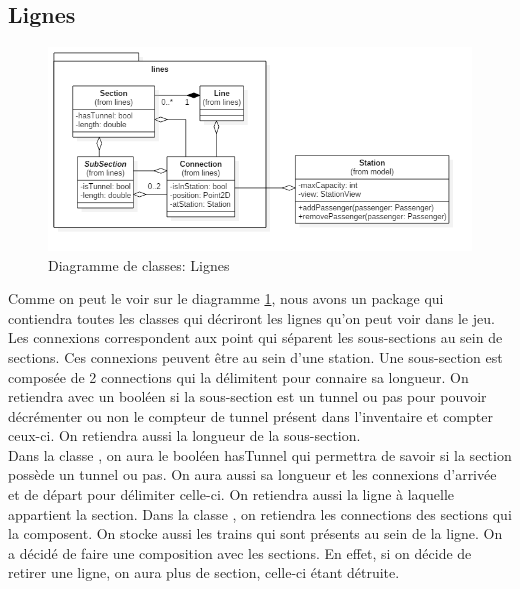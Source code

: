 \documentclass[report, backcover, french, nodocumentinfo]{upmethodology-document}
\begin{document}
			\subsection{Lignes}
				\begin{figure}[h!]
					\centering
					\includegraphics[width=1\textwidth]{figures/LinesClassDiagram}
					\caption{Diagramme de classes: Lignes}
					\label{fig:LinesClassDiagram}
				\end{figure}
					Comme on peut le voir sur le diagramme \ref{fig:LinesClassDiagram}, nous avons un package  qui contiendra toutes les classes qui décriront les lignes qu'on peut voir dans le jeu. Les connexions correspondent aux point qui séparent les sous-sections au sein de sections. Ces connexions peuvent être au sein d'une station.
					Une sous-section est composée de 2 connections qui la délimitent pour connaire sa longueur. On retiendra avec un booléen si la sous-section est un tunnel ou pas pour pouvoir décrémenter ou non le compteur de tunnel présent dans l'inventaire et compter ceux-ci. On retiendra aussi la longueur de la sous-section.\\
					Dans la classe , on aura le booléen hasTunnel qui permettra de savoir si la section possède un tunnel ou pas. On aura aussi sa longueur et les connexions d'arrivée et de départ pour délimiter celle-ci. On retiendra aussi la ligne à laquelle appartient la section.
					Dans la classe , on retiendra les connections des sections qui la composent. On stocke aussi les trains qui sont présents au sein de la ligne. On a décidé de faire une composition avec les sections. En effet, si on décide de retirer une ligne, on aura plus de section, celle-ci étant détruite.
\end{document}
